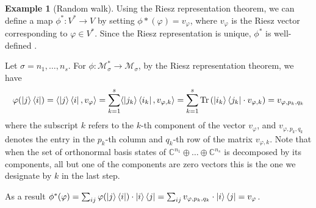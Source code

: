 \documentclass[10pt,a4paper]{amsart}
\theoremstyle{definition}
\theoremstyle{definition}
\newtheorem{example}[definition]{Example}
\theoremstyle{definition}
\theoremstyle{definition}
\theoremstyle{definition}
\theoremstyle{definition}
\begin{document}
\begin{example}[Random walk]
Using the Riesz representation theorem, we can define a map 
$\phi^* : V^* \to V$
by setting \(\phi*(\varphi) = v_\varphi\), where \(v_\varphi\) is the Riesz vector corresponding to \(\varphi \in V^*\). Since the Riesz representation is unique, \(\phi^*\) is well-defined \cite{romanAdvancedLinearAlgebra1992}. 

Let $\sigma= n_1, \ldots, n_s$. For $\phi: \mathcal{M}_\sigma^* \to \mathcal{M}_\sigma $, by the Riesz representation theorem, we have
$$ \varphi(\ket{j} \bra{i})= \langle \ket{j} \bra{i},  v_\varphi  \rangle = \sum_{k=1}^s \langle \ket{j_k} \bra{i_k},  v_{\varphi,k}  \rangle = \sum_{k=1}^s  \text{Tr} \left( \ket{i_k} \bra{j_k} \cdot   v_{\varphi,k} \right) =  v_{\varphi,p_k,q_k} $$
where the subscript \(k\) refers to the \(k\)-th component of the vector \(v_\varphi\), and \(v_{\varphi, p_k, q_k}\) denotes the entry in the \(p_k\)-th column and \(q_k\)-th row of the matrix \(v_{\varphi,k}\). Note that when the set of orthonormal basis states of \(\mathbb{C}^{n_1} \oplus \ldots \oplus \mathbb{C}^{n_s}\) is decomposed by its components, all but one of the components are zero vectors this is the one we designate by $k$ in the last step.

As a result $\phi^*(\varphi) =  \sum_{ij} \varphi(\ket{j}\bra{i}) \cdot \ket{i} \bra{j} = \sum_{ij}  v_{\varphi,p_k,q_k} \cdot  \ket{i} \bra{j}  = v_{\varphi}$.








  \end{example}
  



\newpage
 

\end{document}
